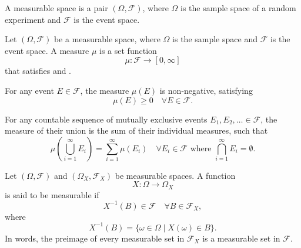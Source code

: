 \begin{definition}
	\label{def:measurable_space}
	A measurable space is a pair $(\Omega, \mathcal{F})$, where $\Omega$ is the sample space of a random experiment and $\mathcal{F}$ is the event space.
\end{definition}

\begin{definition}[Measure]
	\label{def:measure}
	Let $(\Omega, \mathcal{F})$ be a measurable space, where $\Omega$ is the sample space and $\mathcal{F}$ is the event space. A measure $\mu$ is a set function
	\begin{equation}
		\mu: \mathcal{F} \to [0,\infty]
	\end{equation}
	that satisfies  and .
\end{definition}

\begin{axiom}
	\label{ax:non_neg}
	For any event $E\in \mathcal{F}$, the measure $\mu(E)$ is non-negative, satisfying
	\begin{equation}
		\mu(E) \geq 0 \quad \forall E \in  \mathcal{F}.
	\end{equation}
\end{axiom}

\begin{axiom}[Additivity]
	\label{ax:add}
	For any countable sequence of mutually exclusive events $\mathit{E}_1, \mathit{E}_2, \ldots\in \mathcal{F}$, the measure of their union is the sum of their individual measures, such that
	\begin{equation}
		\mu\left(\bigcup_{i=1}^{\infty} \mathit{E}_i\right) = \sum_{i=1}^{\infty} \mu(\mathit{E}_i) \quad \forall \mathit{E}_i \in \mathcal{F} \text{ where } \bigcap_{i=1}^{\infty} \mathit{E}_i = \emptyset.
	\end{equation}
\end{axiom}

\begin{definition}
	\label{def:measurable_function}
	Let $(\Omega,\mathcal{F})$ and $(\Omega_X,\mathcal{F}_X)$ be measurable spaces. A function
	\begin{equation}
		X: \Omega \to \Omega_X
	\end{equation}
	is said to be measurable if
	\begin{equation}
		X^{-1}(B) \in \mathcal{F} \quad \forall B \in \mathcal{F}_X,
	\end{equation}
	where
	\begin{equation}
		X^{-1}(B) = \{\omega \in \Omega \mid X(\omega) \in B\}.
	\end{equation}
	In words, the preimage of every measurable set in $\mathcal{F}_X$ is a measurable set in $\mathcal{F}$.
\end{definition}

